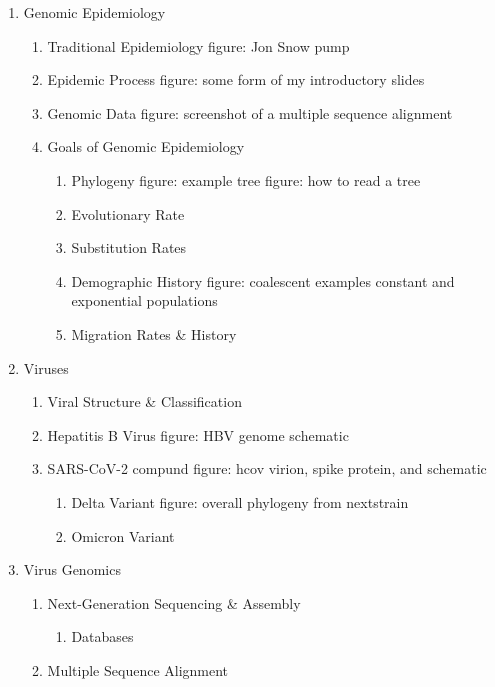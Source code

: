 \clearpage
{}
\begin{enumerate}
  \item Genomic Epidemiology
  \begin{enumerate}
    \item Traditional Epidemiology
    \subitem figure: Jon Snow pump
    \item Epidemic Process
    \subitem figure: some form of my introductory slides
    \item Genomic Data
    \subitem figure: screenshot of a multiple sequence alignment
    \item Goals of Genomic Epidemiology
    \begin{enumerate}
      \item Phylogeny
      \subitem figure: example tree
      \subitem figure: how to read a tree
      \item Evolutionary Rate
      \item Substitution Rates
      \item Demographic History
      \subitem figure: coalescent examples constant and exponential populations
      \item Migration Rates \& History
    \end{enumerate}
  \end{enumerate}
  \item Viruses
  \begin{enumerate}
    \item Viral Structure \& Classification
    \item Hepatitis B Virus
    \subitem figure: HBV genome schematic
    \item SARS-CoV-2
    \subitem compund figure: hcov virion, spike protein, and schematic
    \begin{enumerate}
      \item Delta Variant
      \subitem figure: overall phylogeny from nextstrain
      \item Omicron Variant
    \end{enumerate}
  \end{enumerate}
  \item Virus Genomics
  \begin{enumerate}
    \item Next-Generation Sequencing \& Assembly
    \begin{enumerate}
      \item Databases
    \end{enumerate}
    \item Multiple Sequence Alignment

\end{enumerate}
\end{enumerate}
